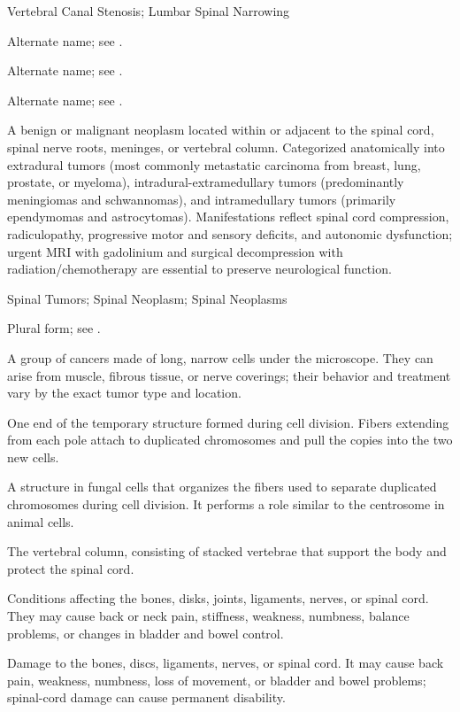 \synonyms
Vertebral Canal Stenosis; Lumbar Spinal Narrowing

 Alternate name; see .

 Alternate name; see .

 Alternate name; see .

 A benign or malignant neoplasm located within or adjacent to the spinal cord, spinal nerve roots, meninges, or vertebral column. Categorized anatomically into extradural tumors (most commonly metastatic carcinoma from breast, lung, prostate, or myeloma), intradural-extramedullary tumors (predominantly meningiomas and schwannomas), and intramedullary tumors (primarily ependymomas and astrocytomas). Manifestations reflect spinal cord compression, radiculopathy, progressive motor and sensory deficits, and autonomic dysfunction; urgent MRI with gadolinium and surgical decompression with radiation/chemotherapy are essential to preserve neurological function.

\synonyms
Spinal Tumors; Spinal Neoplasm; Spinal Neoplasms

 Plural form; see .

 A group of cancers made of long, narrow cells under the microscope. They can arise from muscle, fibrous tissue, or nerve coverings; their behavior and treatment vary by the exact tumor type and location.

 One end of the temporary structure formed during cell division. Fibers extending from each pole attach to duplicated chromosomes and pull the copies into the two new cells.

 A structure in fungal cells that organizes the fibers used to separate duplicated chromosomes during cell division. It performs a role similar to the centrosome in animal cells.

 The vertebral column, consisting of stacked vertebrae that support the body and protect the spinal cord.

 Conditions affecting the bones, disks, joints, ligaments, nerves, or spinal cord. They may cause back or neck pain, stiffness, weakness, numbness, balance problems, or changes in bladder and bowel control.

 Damage to the bones, discs, ligaments, nerves, or spinal cord. It may cause back pain, weakness, numbness, loss of movement, or bladder and bowel problems; spinal-cord damage can cause permanent disability.

